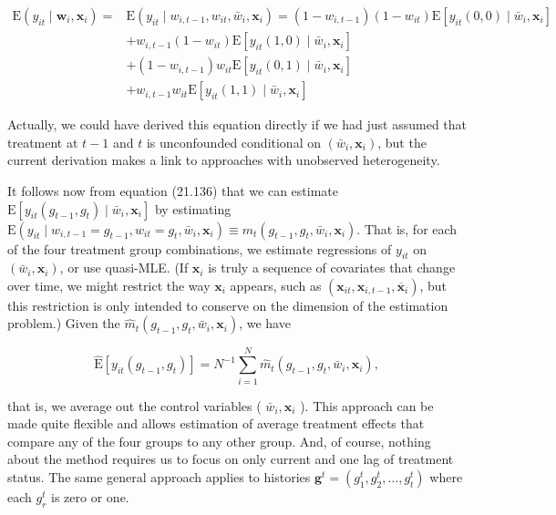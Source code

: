 \documentclass[10pt]{article}
\begin{document}
\begin{align*}
\mathrm{E}\left(y_{i t} \mid \mathbf{w}_{i}, \mathbf{x}_{i}\right)= & \mathrm{E}\left(y_{i t} \mid w_{i, t-1}, w_{i t}, \bar{w}_{i}, \mathbf{x}_{i}\right)=\left(1-w_{i, t-1}\right)\left(1-w_{i t}\right) \mathrm{E}\left[y_{i t}(0,0) \mid \bar{w}_{i}, \mathbf{x}_{i}\right] \\
& +w_{i, t-1}\left(1-w_{i t}\right) \mathrm{E}\left[y_{i t}(1,0) \mid \bar{w}_{i}, \mathbf{x}_{i}\right] \\
& +\left(1-w_{i, t-1}\right) w_{i t} \mathrm{E}\left[y_{i t}(0,1) \mid \bar{w}_{i}, \mathbf{x}_{i}\right] \\
& +w_{i, t-1} w_{i t} \mathrm{E}\left[y_{i t}(1,1) \mid \bar{w}_{i}, \mathbf{x}_{i}\right] \tag{21.136}
\end{align*}


Actually, we could have derived this equation directly if we had just assumed that treatment at $t-1$ and $t$ is unconfounded conditional on $\left(\bar{w}_{i}, \mathbf{x}_{i}\right)$, but the current derivation makes a link to approaches with unobserved heterogeneity.

It follows now from equation (21.136) that we can estimate $\mathrm{E}\left[y_{i t}\left(g_{t-1}, g_{t}\right) \mid \bar{w}_{i}, \mathbf{x}_{i}\right]$ by estimating $\mathrm{E}\left(y_{i t} \mid w_{i, t-1}=g_{t-1}, w_{i t}=g_{t}, \bar{w}_{i}, \mathbf{x}_{i}\right) \equiv m_{t}\left(g_{t-1}, g_{t}, \bar{w}_{i}, \mathbf{x}_{i}\right)$. That is, for each of the four treatment group combinations, we estimate regressions of $y_{i t}$ on $\left(\bar{w}_{i}, \mathbf{x}_{i}\right)$, or use quasi-MLE. (If $\mathbf{x}_{i}$ is truly a sequence of covariates that change over time, we might restrict the way $\mathbf{x}_{i}$ appears, such as $\left(\mathbf{x}_{i t}, \mathbf{x}_{i, t-1}, \overline{\mathbf{x}}_{i}\right)$, but this restriction is only intended to conserve on the dimension of the estimation problem.) Given the $\hat{m}_{t}\left(g_{t-1}, g_{t}, \bar{w}_{i}, \mathbf{x}_{i}\right)$, we have


\begin{equation*}
\hat{\mathrm{E}}\left[y_{i t}\left(g_{t-1}, g_{t}\right)\right]=N^{-1} \sum_{i=1}^{N} \hat{m}_{t}\left(g_{t-1}, g_{t}, \bar{w}_{i}, \mathbf{x}_{i}\right), \tag{21.137}
\end{equation*}


that is, we average out the control variables ( $\bar{w}_{i}, \mathbf{x}_{i}$ ). This approach can be made quite flexible and allows estimation of average treatment effects that compare any of the four groups to any other group. And, of course, nothing about the method requires us to focus on only current and one lag of treatment status. The same general approach applies to histories $\mathbf{g}^{t}=\left(g_{1}^{t}, g_{2}^{t}, \ldots, g_{t}^{t}\right)$ where each $g_{r}^{t}$ is zero or one.
\end{document}
